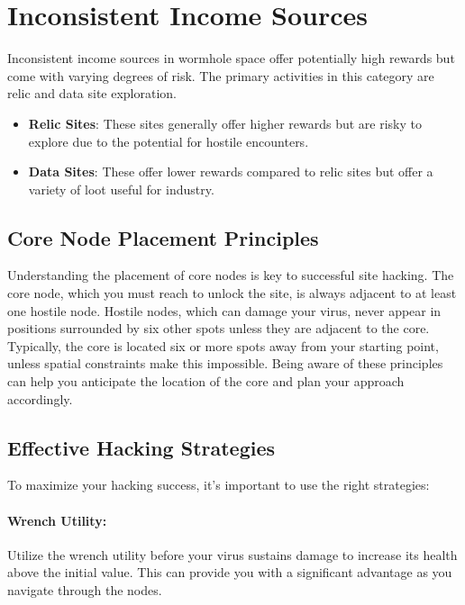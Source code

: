 \documentclass[a4paper,12pt]{report}
\begin{document}
\section{Inconsistent Income Sources}

Inconsistent income sources in wormhole space offer potentially high rewards but come with varying degrees of risk. The primary activities in this category are relic and data site exploration.

\begin{itemize}
    \item \textbf{Relic Sites}: These sites generally offer higher rewards but are risky to explore due to the potential for hostile encounters.
    \item \textbf{Data Sites}: These offer lower rewards compared to relic sites but offer a variety of loot useful for industry.
\end{itemize}

\subsection{Core Node Placement Principles}

Understanding the placement of core nodes is key to successful site hacking. The core node, which you must reach to unlock the site, is always adjacent to at least one hostile node. Hostile nodes, which can damage your virus, never appear in positions surrounded by six other spots unless they are adjacent to the core. Typically, the core is located six or more spots away from your starting point, unless spatial constraints make this impossible. Being aware of these principles can help you anticipate the location of the core and plan your approach accordingly.

\subsection{Effective Hacking Strategies}

To maximize your hacking success, it’s important to use the right strategies:

\paragraph{Wrench Utility:} Utilize the wrench utility before your virus sustains damage to increase its health above the initial value. This can provide you with a significant advantage as you navigate through the nodes.
\end{document}
